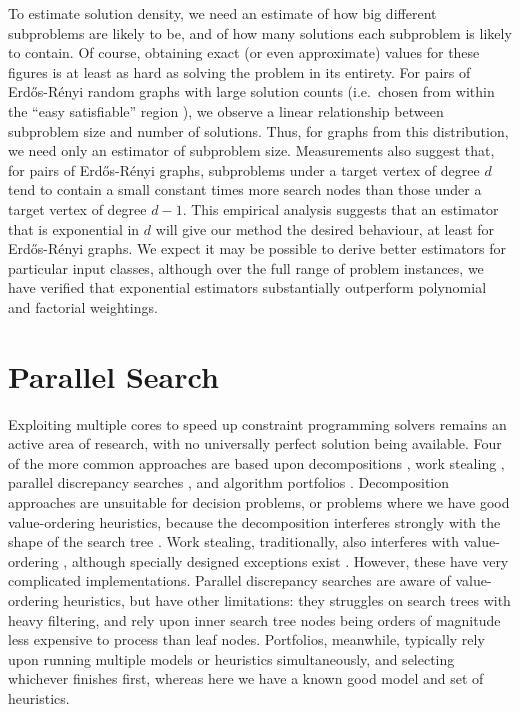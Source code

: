 \documentclass[runningheads]{llncs}
\begin{document}
To estimate solution density, we need an estimate of how big different subproblems are likely to be,
and of how many solutions each subproblem is likely to contain. Of course, obtaining exact (or even
approximate) values for these figures is at least as hard as solving the problem in its entirety.
For pairs of Erd\H{o}s-R\'enyi
random graphs with large solution counts (i.e.\ chosen from within the ``easy satisfiable'' region
\cite{DBLP:journals/jair/McCreeshPST18}), we observe a linear relationship between subproblem size
and number of solutions. Thus, for graphs from this distribution, we need only an estimator of
subproblem size. Measurements also suggest that, for pairs of Erd\H{o}s-R\'enyi graphs, subproblems
under a target vertex of degree $d$ tend to contain a small constant times more search nodes than
those under a target vertex of degree $d - 1$.  This empirical analysis suggests that an estimator
that is exponential in $d$ will give our method the desired behaviour, at least for
Erd\H{o}s-R\'enyi graphs. We expect it may be possible to derive better estimators for particular
input classes, although over the full range of problem instances, we have verified that exponential
estimators substantially outperform polynomial and factorial weightings.

\section{Parallel Search}

Exploiting multiple cores to speed up constraint programming solvers remains an active area of
research, with no universally perfect solution being available. Four of the more common approaches
are based upon decompositions
\cite{DBLP:journals/corr/abs-1008-4328,DBLP:journals/jair/MalapertRR16}, work stealing
\cite{DBLP:conf/cp/MichelSH07,DBLP:conf/cp/ChuSS09,DBLP:conf/cp/McCreeshP15,DBLP:conf/cpaior/HoffmannMNPRS018},
parallel discrepancy searches \cite{DBLP:conf/cp/MoisanGQ13,DBLP:conf/cpaior/MoisanQG14}, and
algorithm portfolios \cite{DBLP:conf/lion/LindauerHH15}. Decomposition approaches are unsuitable for
decision problems, or problems where we have good value-ordering heuristics, because the
decomposition interferes strongly with the shape of the search tree
\cite{DBLP:journals/jair/MalapertRR16}. Work stealing, traditionally, also interferes with
value-ordering \cite{DBLP:journals/topc/McCreeshP15}, although specially designed exceptions exist
\cite{DBLP:conf/cp/ChuSS09,DBLP:conf/cp/McCreeshP15,DBLP:conf/cpaior/HoffmannMNPRS018}. However,
these have very complicated implementations. Parallel discrepancy searches are aware of
value-ordering heuristics, but have other limitations: they struggles on search trees with heavy
filtering, and rely upon inner search tree nodes being orders of magnitude less expensive to process
than leaf nodes. Portfolios, meanwhile, typically rely upon running multiple models or heuristics
simultaneously, and selecting whichever finishes first, whereas here we have a known good model and
set of heuristics.
\end{document}
